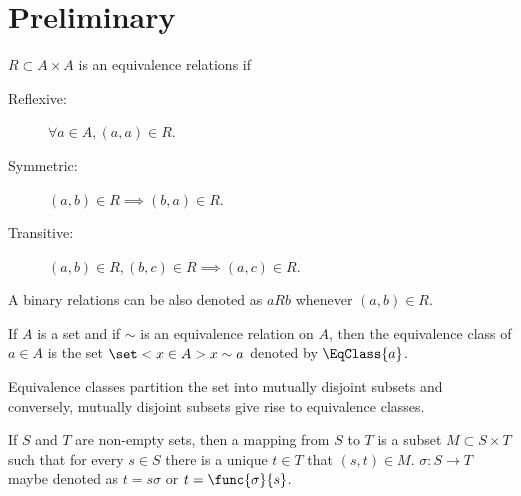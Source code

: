 \chapter{Preliminary}
\(R \subset A \times A\) is an equivalence relations if 
\begin{description}
    \item [Reflexive:] \(\forall a \in A, (a,a) \in R\).
    \item [Symmetric:] \((a,b) \in R \implies (b,a) \in R\).
    \item [Transitive:] \((a,b) \in R, (b,c) \in R \implies (a,c) \in R\).
\end{description}

A binary relations can be also denoted as \(aRb\) whenever \((a,b) \in R\).

If \(A\) is a set and if \(\sim\) is an equivalence relation on \(A\), then the equivalence class of \(a \in A\) is the set \(\set<x \in A>{x \sim a}\) denoted by \(\EqClass{a}\).

\begin{theorem}
    Equivalence classes partition the set into mutually disjoint subsets and conversely, mutually disjoint subsets give rise to equivalence classes.
\end{theorem}

If \(S\) and \(T\) are non-empty sets, then a mapping from \(S\) to \(T\) is a subset \(M \subset S \times T\) such that for every \(s \in S\) there is a unique \(t \in T\) that \((s,t) \in M\). \(\sigma:S \to T\) maybe denoted as \(t = s \sigma\) or \(t = \func{\sigma}{s}\).

